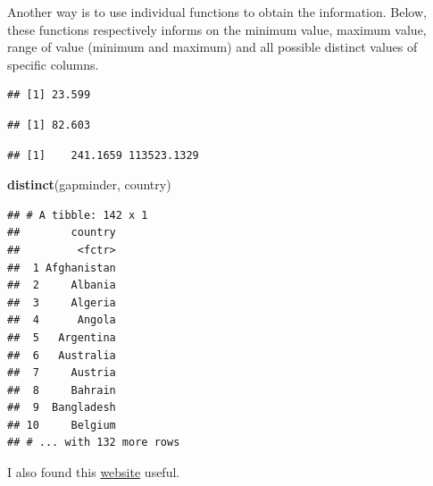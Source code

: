 \documentclass[]{article}
\newenvironment{Shaded}{\begin{snugshade}}{\end{snugshade}}
\newcommand{\KeywordTok}[1]{\textcolor[rgb]{0.13,0.29,0.53}{\textbf{{#1}}}}
\newcommand{\NormalTok}[1]{{#1}}
\begin{document}
Another way is to use individual functions to obtain the information.
Below, these functions respectively informs on the minimum value,
maximum value, range of value (minimum and maximum) and all possible
distinct values of specific columns.

\begin{Shaded}
\end{Shaded}

\begin{verbatim}
## [1] 23.599
\end{verbatim}

\begin{Shaded}
\end{Shaded}

\begin{verbatim}
## [1] 82.603
\end{verbatim}

\begin{Shaded}
\end{Shaded}

\begin{verbatim}
## [1]    241.1659 113523.1329
\end{verbatim}

\begin{Shaded}
\begin{Highlighting}[]
\KeywordTok{distinct}\NormalTok{(gapminder, country)}
\end{Highlighting}
\end{Shaded}

\begin{verbatim}
## # A tibble: 142 x 1
##        country
##         <fctr>
##  1 Afghanistan
##  2     Albania
##  3     Algeria
##  4      Angola
##  5   Argentina
##  6   Australia
##  7     Austria
##  8     Bahrain
##  9  Bangladesh
## 10     Belgium
## # ... with 132 more rows
\end{verbatim}

I also found this
\href{https://info201-s17.github.io/book/introduction-to-data-frames.html}{website}
useful.
\end{document}
